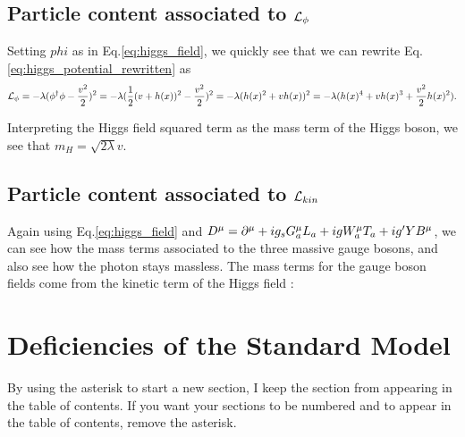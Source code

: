 \subsection{Particle content associated to $\mathcal{L}_\phi$}

Setting $phi$ as in Eq.\ref{eq:higgs_field}, we quickly see that we can rewrite Eq.\ref{eq:higgs_potential_rewritten} as
\begin{equation}
\mathcal{L}_\phi = - \lambda (\phi^\dagger \phi - \frac{v^2}{2})^2  = - \lambda ( \frac{1}{2} (v + h(x))^2 - \frac{v^2}{2})^2 = - \lambda ( h(x)^2 + vh(x))^2 = -\lambda ( h(x)^4 + v h(x)^3 + \frac{v^2}{2} h(x)^2 ).
\end{equation}

Interpreting the Higgs field squared term as the mass term of the Higgs boson, we see that $m_H = \sqrt{2 \lambda} v$.

\subsection{Particle content associated to $\mathcal{L}_{kin}$}

Again using Eq.\ref{eq:higgs_field} and $D^\mu = \partial^\mu + ig_s G^\mu_a L_a + i g W^\mu_a T_a + i g' Y B^\mu $, we can see how the mass terms associated to the three massive gauge bosons, and also see how the photon stays massless.
The mass terms for the gauge boson fields come from the kinetic term of the Higgs field :

\section{Deficiencies of the Standard Model}

By using the asterisk to start a new section, I keep the section from appearing in the table of contents.
If you want your sections to be numbered and to appear in the table of contents, remove the asterisk.



